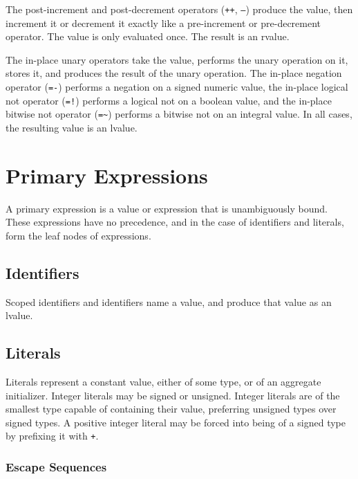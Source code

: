 \documentclass[letterpaper,12pt]{book}
\begin{document}
The post-increment and post-decrement operators (\texttt{++}, \texttt{--}) produce the value, then increment it or decrement it exactly like a pre-increment or pre-decrement operator. The value is only evaluated once. The result is an rvalue.

The in-place unary operators take the value, performs the unary operation on it, stores it, and produces the result of the unary operation. The in-place negation operator (\texttt{=-}) performs a negation on a signed numeric value, the in-place logical not operator (\texttt{=!}) performs a logical not on a boolean value, and the in-place bitwise not operator (\texttt{=\~{}}) performs a bitwise not on an integral value. In all cases, the resulting value is an lvalue.

\section{Primary Expressions}



A primary expression is a value or expression that is unambiguously bound. These expressions have no precedence, and in the case of identifiers and literals, form the leaf nodes of expressions.

\subsection{Identifiers}

Scoped identifiers and identifiers name a value, and produce that value as an lvalue.

\subsection{Literals}



Literals represent a constant value, either of some type, or of an aggregate initializer. Integer literals may be signed or unsigned. Integer literals are of the smallest type capable of containing their value, preferring unsigned types over signed types. A positive integer literal may be forced into being of a signed type by prefixing it with \texttt{+}.

\subsubsection{Escape Sequences}
\end{document}
